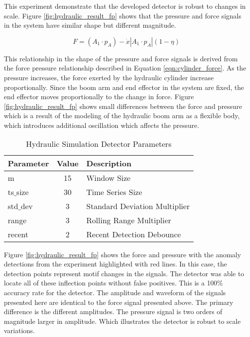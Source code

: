 This experiment demonstrate that the developed detector is robust to changes in scale. Figure \ref{fig:hydraulic_result_fp} shows that the pressure and force signals in the system have similar shape but different magnitude. 

\begin{equation}
    \label{eqn:cylinder_force}
    F = (A_1 \cdot p_A) - \dot{x}  | A_1 \cdot p_A | (1 - \eta)
\end{equation}

This relationship in the shape of the pressure and force signals is derived from the force pressure relationship described in Equation \ref{eqn:cylinder_force}. As the pressure increases, the force exerted by the hydraulic cylinder increase proportionally. Since the boom arm and end effector in the system are fixed, the end effector moves proportionally to the change in force. Figure \ref{fig:hydraulic_result_fp} shows small differences between the force and pressure which is a result of the modeling of the hydraulic boom arm as a flexible body, which introduces additional oscillation which affects the pressure.

\begin{table}[H]
\caption{Hydraulic Simulation Detector Parameters}
\begin{tabular}{|l|c|l|}
    \hline
	\textbf{Parameter} & \textbf{Value} & \textbf{Description} \\ \hline
	m & 15 & Window Size \\ \hline
	ts$\_$size & 30 & Time Series Size \\ \hline
	std$\_$dev & 3 & Standard Deviation Multiplier \\ \hline
	range & 3 & Rolling Range Multiplier\\ \hline
	recent & 2 & Recent Detection Debounce\\ \hline
\end{tabular}
\label{tab:hydraulic_sim_params}
\end{table}

Figure \ref{fig:hydraulic_result_fp} shows the force and pressure with the anomaly detections from the experiment highlighted with red lines. In this case, the detection points represent motif changes in the signals. The detector was able to locate all of these inflection points without false positives. This is a 100\% accuracy rate for the detector. The amplitude and waveform of the signals presented here are identical to the force signal presented above. The primary difference is the different amplitudes. The pressure signal is two orders of magnitude larger in amplitude. Which illustrates the detector is robust to scale variations.

